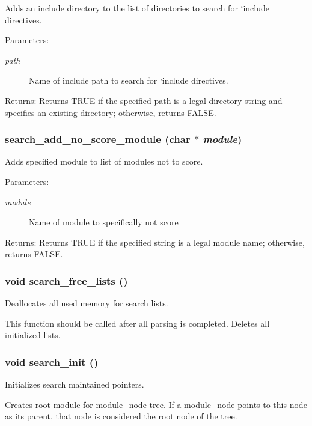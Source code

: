 Adds an include directory to the list of directories to search for `include directives. 

\begin{Desc}
\item[Parameters:]
\begin{description}
\item[{\em path}]Name of include path to search for `include directives. \end{description}
\end{Desc}
\begin{Desc}
\item[Returns:]Returns TRUE if the specified path is a legal directory string and specifies an existing directory; otherwise, returns FALSE. \end{Desc}
\subsubsection{ search\_\-add\_\-no\_\-score\_\-module (char $\ast$ {\em module})}\label{search_8h_a4}


Adds specified module to list of modules not to score. 

\begin{Desc}
\item[Parameters:]
\begin{description}
\item[{\em module}]Name of module to specifically not score \end{description}
\end{Desc}
\begin{Desc}
\item[Returns:]Returns TRUE if the specified string is a legal module name; otherwise, returns FALSE. \end{Desc}
\subsubsection{\setlength{\rightskip}{0pt plus 5cm}void search\_\-free\_\-lists ()}\label{search_8h_a6}


Deallocates all used memory for search lists. 

This function should be called after all parsing is completed. Deletes all initialized lists. 
\subsubsection{\setlength{\rightskip}{0pt plus 5cm}void search\_\-init ()}\label{search_8h_a0}


Initializes search maintained pointers. 

Creates root module for module\_\-node tree. If a module\_\-node points to this node as its parent, that node is considered the root node of the tree. 